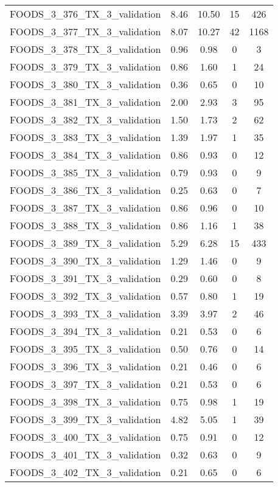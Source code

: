 \begin{table}
\begin{tabular}{|l|c|c|c|c|}
FOODS\_3\_376\_TX\_3\_validation & 8.46 & 10.50 & 15 & 426 \\
FOODS\_3\_377\_TX\_3\_validation & 8.07 & 10.27 & 42 & 1168 \\
FOODS\_3\_378\_TX\_3\_validation & 0.96 & 0.98 & 0 & 3 \\
FOODS\_3\_379\_TX\_3\_validation & 0.86 & 1.60 & 1 & 24 \\
FOODS\_3\_380\_TX\_3\_validation & 0.36 & 0.65 & 0 & 10 \\
FOODS\_3\_381\_TX\_3\_validation & 2.00 & 2.93 & 3 & 95 \\
FOODS\_3\_382\_TX\_3\_validation & 1.50 & 1.73 & 2 & 62 \\
FOODS\_3\_383\_TX\_3\_validation & 1.39 & 1.97 & 1 & 35 \\
FOODS\_3\_384\_TX\_3\_validation & 0.86 & 0.93 & 0 & 12 \\
FOODS\_3\_385\_TX\_3\_validation & 0.79 & 0.93 & 0 & 9 \\
FOODS\_3\_386\_TX\_3\_validation & 0.25 & 0.63 & 0 & 7 \\
FOODS\_3\_387\_TX\_3\_validation & 0.86 & 0.96 & 0 & 10 \\
FOODS\_3\_388\_TX\_3\_validation & 0.86 & 1.16 & 1 & 38 \\
FOODS\_3\_389\_TX\_3\_validation & 5.29 & 6.28 & 15 & 433 \\
FOODS\_3\_390\_TX\_3\_validation & 1.29 & 1.46 & 0 & 9 \\
FOODS\_3\_391\_TX\_3\_validation & 0.29 & 0.60 & 0 & 8 \\
FOODS\_3\_392\_TX\_3\_validation & 0.57 & 0.80 & 1 & 19 \\
FOODS\_3\_393\_TX\_3\_validation & 3.39 & 3.97 & 2 & 46 \\
FOODS\_3\_394\_TX\_3\_validation & 0.21 & 0.53 & 0 & 6 \\
FOODS\_3\_395\_TX\_3\_validation & 0.50 & 0.76 & 0 & 14 \\
FOODS\_3\_396\_TX\_3\_validation & 0.21 & 0.46 & 0 & 6 \\
FOODS\_3\_397\_TX\_3\_validation & 0.21 & 0.53 & 0 & 6 \\
FOODS\_3\_398\_TX\_3\_validation & 0.75 & 0.98 & 1 & 19 \\
FOODS\_3\_399\_TX\_3\_validation & 4.82 & 5.05 & 1 & 39 \\
FOODS\_3\_400\_TX\_3\_validation & 0.75 & 0.91 & 0 & 12 \\
FOODS\_3\_401\_TX\_3\_validation & 0.32 & 0.63 & 0 & 9 \\
FOODS\_3\_402\_TX\_3\_validation & 0.21 & 0.65 & 0 & 6 \\

\end{tabular}
\end{table}
